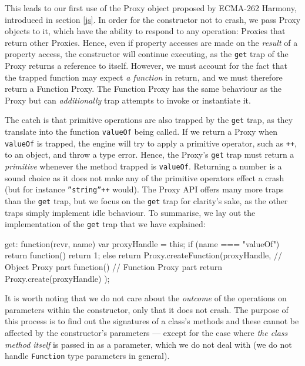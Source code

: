 This leads to our first use of the Proxy object proposed by ECMA-262 Harmony, introduced in section \ref{js}. In order for the constructor not to crash, we pass Proxy objects to it, which have the ability to respond to any operation: Proxies that return other Proxies. Hence, even if property accesses are made on the \emph{result} of a property access, the constructor will continue executing, as the \texttt{get} trap of the Proxy returns a reference to itself. However, we must account for the fact that the trapped function may expect \emph{a function} in return, and we must therefore return a Function Proxy. The Function Proxy has the same behaviour as the Proxy but can \emph{additionally} trap attempts to invoke or instantiate it.

The catch is that primitive operations are also trapped by the \texttt{get} trap, as they translate into the function \texttt{valueOf} being called. If we return a Proxy when \texttt{valueOf} is trapped, the engine will try to apply a primitive operator, such as \texttt{++}, to an object, and throw a type error. Hence, the Proxy's \texttt{get} trap must return a \emph{primitive} whenever the method trapped is \texttt{valueOf}. Returning a number is a sound choice as it does not make any of the primitive operators effect a crash (but for instance \texttt{''string''++} would). The Proxy API offers many more traps than the \texttt{get} trap, but we focus on the \texttt{get} trap for clarity's sake, as the other traps simply implement idle behaviour. To summarise, we lay out the implementation of the \texttt{get} trap that we have explained:

\begin{code}[caption=\textsf{Analyser} Proxy's \texttt{get} trap,label=gettrap]
get: function(rcvr, name) {
    var proxyHandle = this;
    if (name === "valueOf") {
        return function() {
            return 1;
        }
    }
    else {
        return Proxy.createFunction(proxyHandle, // Object Proxy part
                                    function() { // Function Proxy part
                                        return Proxy.create(proxyHandle)
                                    });
    }
}   
\end{code}

It is worth noting that we do not care about the \emph{outcome} of the operations on parameters within the constructor, only that it does not crash. The purpose of this process is to find out the signatures of a class's methods and these cannot be affected by the constructor's parameters --- except for the case where \emph{the class method itself} is passed in as a parameter, which we do not deal with (we do not handle \texttt{Function} type parameters in general).

